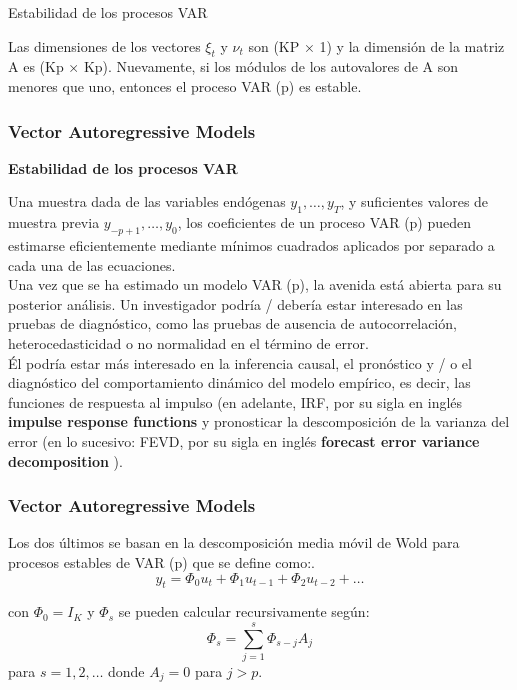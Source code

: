 \documentclass[spanish,xcolor=table]{beamer}
\begin{document}
\begin{section}{Estabilidad de los procesos VAR}
\begin{frame}
Las dimensiones de los vectores $\xi_t$ y $\nu_t$ son (KP × 1) y la dimensión de la matriz A es (Kp × Kp). Nuevamente, si los m\'odulos de los autovalores de A son menores que uno, entonces el proceso VAR (p) es estable.

\end{frame}
\begin{frame}
\frametitle{Vector Autoregressive Models}

\textbf{Estabilidad de los procesos VAR}

Una muestra dada de las variables end\'ogenas $y_1,\dots{}, y_T$, y suficientes valores de muestra previa $y_{-p + 1},\dots{}, y_0$, los coeficientes de un proceso VAR (p) pueden estimarse eficientemente mediante m\'{i}nimos cuadrados aplicados por separado a cada una de las ecuaciones.\\

Una vez que se ha estimado un modelo VAR (p), la avenida est\'a abierta para su posterior an\'alisis. Un investigador podr\'{i}a / deber\'{i}a estar interesado en las pruebas de diagn\'ostico, como las pruebas de ausencia de autocorrelaci\'on, heterocedasticidad o no normalidad en el t\'ermino de error.\\
 \'El podr\'{i}a estar m\'as interesado en la inferencia causal, el pron\'ostico y / o el diagn\'ostico del comportamiento din\'amico del modelo emp\'{i}rico, es decir, las funciones de respuesta al impulso (en adelante, IRF, por su sigla en ingl\'es \textbf{impulse response functions} y pronosticar la descomposición de la varianza del error (en lo sucesivo: FEVD, por su sigla en ingl\'es \textbf{forecast error variance decomposition }). 

\end{frame}
\begin{frame}
\frametitle{Vector Autoregressive Models}
Los dos \'ultimos se basan en la descomposici\'on media m\'ovil de Wold para procesos estables de VAR (p) que se define como:.
\begin{equation*}
y_t = \Phi_0u_t + \Phi_1u_{t-1} + \Phi_2u_{t-2} + \dots{}
\end{equation*}

con $\Phi_0 = I_K$ y $\Phi_s$ se pueden calcular recursivamente según: 
\begin{equation*}
\Phi_s = \sum_{j=1}^{s}\Phi_{s-j}A_j 
\end{equation*}
para $s = 1,2, \dots{}$ donde $A_j = 0$ para $j > p$.\\


\end{frame}
\end{section}
\end{document}
